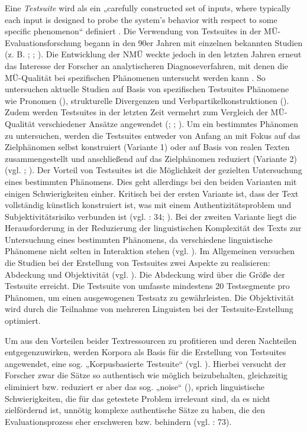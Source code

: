 Eine \textit{Testsuite} wird als ein „carefully constructed set of inputs, where typically each input is designed to probe the system’s behavior with respect to some specific phenomenon“ definiert \citep{King1993}. Die Verwendung von Testsuites in der MÜ-Evaluationsforschung begann in den 90er Jahren mit einzelnen bekannten Studien (z. B. \citealt{KingFalkedal1990}; \citealt{Isahara1995}; \citealt{KohEtAl2001}). Die Entwicklung der NMÜ weckte jedoch in den letzten Jahren erneut das Interesse der Forscher an analytischeren Diagnoseverfahren, mit denen die MÜ-Qualität bei spezifischen Phänomenen untersucht werden kann \citep{MacketanzEtAl2018}. So untersuchen aktuelle Studien auf Basis von spezifischen Testsuites Phänomene wie Pronomen (\citealt{GuillouHardmeier2016}), strukturelle Divergenzen \citep{IsabelleEtAl2017} und Verbpartikelkonstruktionen (\citealt{SchottmüllerNivre2014}). Zudem werden Testsuites in der letzten Zeit vermehrt zum Vergleich der MÜ-Qualität verschiedener Ansätze angewendet (\citealt{BentivogliEtAl2016}; \citealt{BeyerEtAl2017}; \citealt{BurchardtEtAl2017}). Um ein bestimmtes Phänomen zu untersuchen, werden die Testsuites entweder von Anfang an mit Fokus auf das Zielphänomen selbst konstruiert (Variante 1) oder auf Basis von realen Texten zusammengestellt und anschließend auf das Zielphänomen reduziert (Variante 2) (vgl. \citealt{KingFalkedal1990}; \citealt{KohEtAl2001}). Der Vorteil von Testsuites ist die Möglichkeit der gezielten Untersuchung eines bestimmten Phänomens. Dies geht allerdings bei den beiden Varianten mit einigen Schwierigkeiten einher. Kritisch bei der ersten Variante ist, dass der Text vollständig künstlich konstruiert ist, was mit einem Authentizitätsproblem und Subjektivitätsrisiko verbunden ist (vgl. \citealt{BalkanEtAl1994}: 34; \citealt{KohEtAl2001}). Bei der zweiten Variante liegt die Herausforderung in der Reduzierung der linguistischen Komplexität des Texts zur Untersuchung eines bestimmten Phänomens, da verschiedene linguistische Phänomene nicht selten in Interaktion stehen (vgl. \citealt{KingFalkedal1990}). Im Allgemeinen versuchen die Studien bei der Erstellung von Testsuites zwei Aspekte zu realisieren: Abdeckung und Objektivität (vgl. \citealt{KohEtAl2001}). Die Abdeckung wird über die Größe der Testsuite erreicht. Die Testsuite von \citet{MacketanzEtAl2018} umfasste mindestens 20 Testsegmente pro Phänomen, um einen ausgewogenen Testsatz zu gewährleisten. Die Objektivität wird durch die Teilnahme von mehreren Linguisten bei der Testsuite-Erstellung optimiert.

Um aus den Vorteilen beider Textressourcen zu profitieren und deren Nachteilen entgegenzuwirken, werden Korpora als Basis für die Erstellung von Testsuites angewendet, eine sog. „Korpusbasierte Testsuite“ (vgl. \citealt{BalkanFouvry1995}). Hierbei versucht der Forscher zwar die Sätze so authentisch wie möglich beizubehalten, gleichzeitig eliminiert bzw. reduziert er aber das sog. „noise“ (\citealt{KingFalkedal1990}), sprich linguistische Schwierigkeiten, die für das getestete Problem irrelevant sind, da es nicht zielfördernd ist, unnötig komplexe authentische Sätze zu haben, die den Evaluationsprozess eher erschweren bzw. behindern (vgl. \citealt{Roturier2006}: 73).

